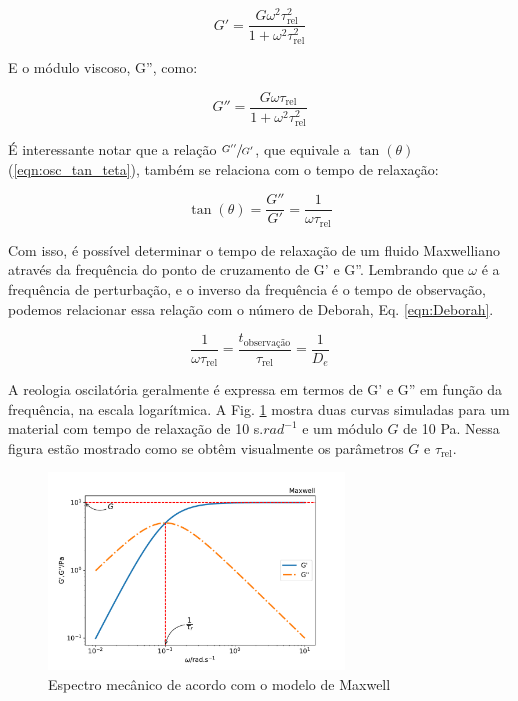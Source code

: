 			\begin{equation}
				G' = \dfrac{ G \omega^2 \tau_{\textrm{rel}}^2   }{  1 + \omega^2 \tau_{\textrm{rel}}^2      }
				\label{eqn:Maxwell_G1_def}
			\end{equation}
			
			E o módulo viscoso, G'', como:
			
			\begin{equation}
				G'' = \dfrac{  G \omega  \tau_{\textrm{rel}}        }{ 1 + \omega^2 \tau_{\textrm{rel}}^2 }
				\label{eqn:Maxwell_G2_def}
			\end{equation}
			
			É interessante notar que a relação \(\sfrac{G''}{G'}\), que equivale a \(\tan(\theta)\) (\ref{eqn:osc_tan_teta}), também se relaciona com o tempo de relaxação:
			
			\begin{equation}
				\tan(\theta) = \dfrac{G''}{G'} = \dfrac{1}{\omega\tau_{\textrm{rel}}}
				\label{eqn:Maxwell_cruzamento}
			\end{equation}
			
			Com isso, é possível determinar o tempo de relaxação de um fluido Maxwelliano através da frequência do ponto de cruzamento de G' e G''. Lembrando que \(\omega\) é a frequência de perturbação, e o inverso da frequência é o tempo de observação, podemos relacionar essa relação com o número de Deborah, Eq. \ref{eqn:Deborah}.
			
			\begin{equation}
				\dfrac{1}{\omega\tau_{\textrm{rel}}} = \dfrac{ t_{\textrm{observação}  }}{ \tau_{\textrm{rel}}  } = \dfrac{1}{D_e}
				\label{eqn:Maxwell_cruzamento_Deborah}
			\end{equation}

			A reologia oscilatória geralmente é expressa em termos de G' e G'' em função da frequência, na escala logarítmica. A Fig. \ref{fig:modelo_maxwell} mostra duas curvas simuladas para um material com tempo de relaxação de 10 s.$rad^{-1}$ e um módulo \(G\) de 10 Pa. Nessa figura estão mostrado como se obtêm visualmente os parâmetros \(G\) e \(\tau_{\textrm{rel}}\).
			
			\begin{figure}[H]
				\centering
				\includegraphics[width=0.7\textwidth]{./imagens/reologia/modelo_maxwell}
				\caption{Espectro mecânico de acordo com o modelo de Maxwell}
				\label{fig:modelo_maxwell}
			\end{figure}
						
